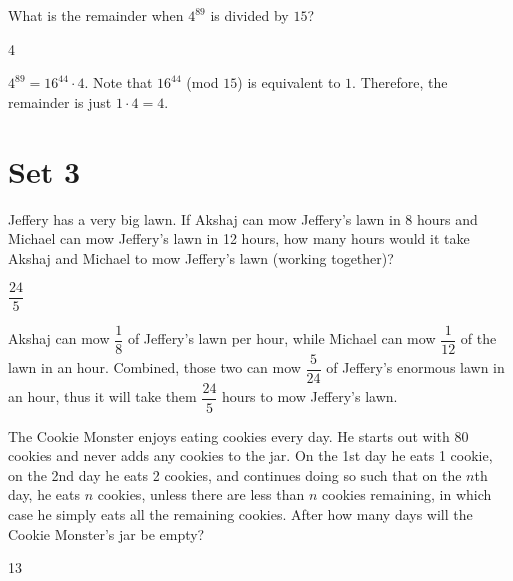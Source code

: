 \documentclass[11pt]{article}
\begin{document}
\begin{problem}%
What is the remainder when $4^{89}$ is divided by $15$?
\end{problem}

\begin{answer}
4
\end{answer}

\begin{solution}
$4^{89} = 16^{44}\cdot 4$. Note that $16^{44}$ (mod $15$) is equivalent to $1$. Therefore, the remainder is just $1\cdot4 = 4$.
\end{solution}

\newpage

\section*{Set 3}

\begin{problem}%
Jeffery has a very big lawn. If Akshaj can mow Jeffery's lawn in 8 hours and Michael can mow Jeffery's lawn in 12 hours, how many hours would it take Akshaj and Michael to mow Jeffery's lawn (working together)?
\end{problem}

\begin{answer}
$\dfrac{24}{5}$
\end{answer}

\begin{solution}
Akshaj can mow $\dfrac{1}{8}$ of Jeffery's lawn per hour, while Michael can mow $\dfrac{1}{12}$ of the lawn in an hour. Combined, those two can mow $\dfrac{5}{24}$ of Jeffery's enormous lawn in an hour, thus it will take them $\dfrac{24}{5}$ hours to mow Jeffery's lawn.
\end{solution}


\begin{problem}%
The Cookie Monster enjoys eating cookies every day. He starts out with 80 cookies and never adds any cookies to the jar. On the 1st day he eats 1 cookie, on the 2nd day he eats 2 cookies, and continues doing so such that on the $n$th day, he eats $n$ cookies, unless there are less than $n$ cookies remaining, in which case he simply eats all the remaining cookies. After how many days will the Cookie Monster's jar be empty? 
\end{problem}

\begin{answer}
13
\end{answer}
\end{document}
